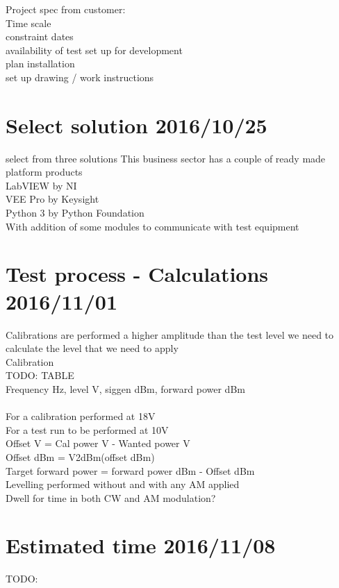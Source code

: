 \documentclass[a4paper]{article}
\begin{document}
Project spec from customer:\\
Time scale\\
constraint dates\\
availability of test set up for development\\
plan installation\\
set up drawing / work instructions\\

\section{Select solution 2016/10/25}
select from three solutions
This business sector has a couple of ready made platform products\\
LabVIEW by NI\\
VEE Pro by Keysight\\
Python 3 by Python Foundation\\
  With addition of some modules to communicate with test equipment\\

\section{Test process - Calculations 2016/11/01}
Calibrations are performed a higher amplitude than the test level we need to calculate the level that we need to apply\\
Calibration\\
TODO: TABLE\\
Frequency Hz, level V, siggen dBm, forward power dBm\\
\\
For a calibration performed at 18V\\
For a test run to be performed at 10V\\
Offset V = Cal power V - Wanted power V\\
Offset dBm = V2dBm(offset dBm)\\
Target forward power = forward power dBm - Offset dBm\\

Levelling performed without and with any AM applied\\
Dwell for time in both CW and AM modulation?\\

\section{Estimated time 2016/11/08}
TODO:
\end{document}
